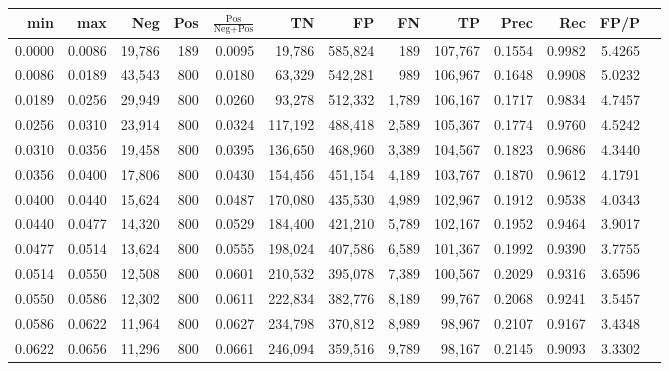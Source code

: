 \begin{tabular}{rrrrrrrrrrrrr}
\toprule
   min &    max &    Neg &   Pos & $\frac{\text{Pos}}{\text{Neg}+\text{Pos}}$ &      TN &      FP &      FN &      TP &   Prec &    Rec &   FP/P \\
\midrule
0.0000 & 0.0086 & 19,786 &   189 &                                     0.0095 &  19,786 & 585,824 &     189 & 107,767 & 0.1554 & 0.9982 & 5.4265 \\
0.0086 & 0.0189 & 43,543 &   800 &                                     0.0180 &  63,329 & 542,281 &     989 & 106,967 & 0.1648 & 0.9908 & 5.0232 \\
0.0189 & 0.0256 & 29,949 &   800 &                                     0.0260 &  93,278 & 512,332 &   1,789 & 106,167 & 0.1717 & 0.9834 & 4.7457 \\
0.0256 & 0.0310 & 23,914 &   800 &                                     0.0324 & 117,192 & 488,418 &   2,589 & 105,367 & 0.1774 & 0.9760 & 4.5242 \\
0.0310 & 0.0356 & 19,458 &   800 &                                     0.0395 & 136,650 & 468,960 &   3,389 & 104,567 & 0.1823 & 0.9686 & 4.3440 \\
0.0356 & 0.0400 & 17,806 &   800 &                                     0.0430 & 154,456 & 451,154 &   4,189 & 103,767 & 0.1870 & 0.9612 & 4.1791 \\
0.0400 & 0.0440 & 15,624 &   800 &                                     0.0487 & 170,080 & 435,530 &   4,989 & 102,967 & 0.1912 & 0.9538 & 4.0343 \\
0.0440 & 0.0477 & 14,320 &   800 &                                     0.0529 & 184,400 & 421,210 &   5,789 & 102,167 & 0.1952 & 0.9464 & 3.9017 \\
0.0477 & 0.0514 & 13,624 &   800 &                                     0.0555 & 198,024 & 407,586 &   6,589 & 101,367 & 0.1992 & 0.9390 & 3.7755 \\
0.0514 & 0.0550 & 12,508 &   800 &                                     0.0601 & 210,532 & 395,078 &   7,389 & 100,567 & 0.2029 & 0.9316 & 3.6596 \\
0.0550 & 0.0586 & 12,302 &   800 &                                     0.0611 & 222,834 & 382,776 &   8,189 &  99,767 & 0.2068 & 0.9241 & 3.5457 \\
0.0586 & 0.0622 & 11,964 &   800 &                                     0.0627 & 234,798 & 370,812 &   8,989 &  98,967 & 0.2107 & 0.9167 & 3.4348 \\
0.0622 & 0.0656 & 11,296 &   800 &                                     0.0661 & 246,094 & 359,516 &   9,789 &  98,167 & 0.2145 & 0.9093 & 3.3302 \\

\end{tabular}
